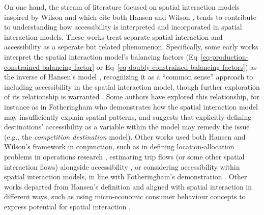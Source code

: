 \documentclass[
  10pt,
  letterpaper,
]{article}
\begin{document}
On one hand, the stream of literature focused on spatial interaction
models inspired by Wilson \citep{wilson1971} and which cite both Hansen
\citep{hansen1959} and Wilson \citep{wilson1971}, tends to contribute to
understanding how accessibility is interpreted and incorporated in
spatial interaction models. These works treat separate spatial
interaction and accessibility as a seperate but related phenomenon.
Specifically, some early works interpret the spatial interaction model's
balancing factors (Eq~\ref{eq-production-constrained-balancing-factor}
or Eq~\ref{eq-doubly-constrained-balancing-factors}) as the inverse of
Hansen's \citep{hansen1959} model
\citep{harrisEquilibriumValuesDynamics1978, leonardiOptimumFacilityLocation1978, fotheringhamSPATIALSTRUCTUREDISTANCE1981, fotheringhamSpatialCompetitionAgglomeration1985},
recognizing it as a ``common sense'' approach
\citep[p.~99]{morrisAccessibilityIndicatorsTransport1979} to including
accessibility in the spatial interaction model, though further
exploration of its relationship is warranted
\citep{battyMethodResiduesUrban1976}. Some authors have explored this
relationship, for instance as in Fotheringham
\citep{fotheringhamSpatialCompetitionAgglomeration1985} who demonstrates
how the spatial interaction model may insufficiently explain spatial
patterns, and suggests that explicitly defining destinations'
accessibility as a variable within the model may remedy the issue (e.g.,
the \emph{competition destination} model). Other works used both Hansen
\citep{hansen1959} and Wilson's \citep{wilson1971} framework in
conjunction, such as in defining location-allocation problems in
operations research
\citep{leonardiOptimumFacilityLocation1978, beaumontLocationallocationProblemsPlane1981},
estimating trip flows (or some other spatial interaction flows)
alongside accessibility
\citep[e.g.,][]{clarke2002deriving, grengs2004measuring, turk2019socio},
or considering accessibility within spatial interaction models, in line
with Fotheringham's
\citep{fotheringhamSpatialCompetitionAgglomeration1985} demonstration
\citep[e.g.,][]{beckers2022incorporating}. Other works departed from
Hansen's \citep{hansen1959} definition and aligned with spatial
interaction in different ways, such as using micro-economic consumer
behaviour concepts to express potential for spatial interaction
\citep{morrisAccessibilityIndicatorsTransport1979, leonardiRandomUtilityDemand1984}.
\end{document}
